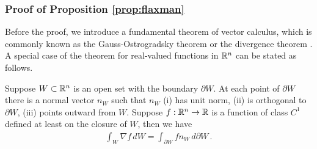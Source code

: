 
\subsubsection*{Proof of Proposition \ref{prop:flaxman}}
Before the proof, we introduce a fundamental theorem of vector calculus, which is commonly known as the Gauss-Ostrogradsky theorem or the divergence theorem . A special case of the theorem for real-valued functions in $\mathbb{R}^n$ can be stated as follows.
\begin{lemma}
\label{lem:gradientCalculus}
Suppose $W \subset \mathbb{R}^n$ is an open set with the boundary $\partial W$. At each point of $\partial W$ there is a normal vector $n_W$ such that $n_W$  (i) has unit norm, (ii) is orthogonal to $\partial W$, (iii) points outward from $W$. Suppose $f: \mathbb{R}^n\to \mathbb{R}$ is a function of class $C^1$ defined at least on the closure of $W$, then we have
\begin{align*}
\int_{ W} \nabla f\,d W = \int_{\partial W} f n_W \,d \partial W \,.
\end{align*}
\end{lemma}

